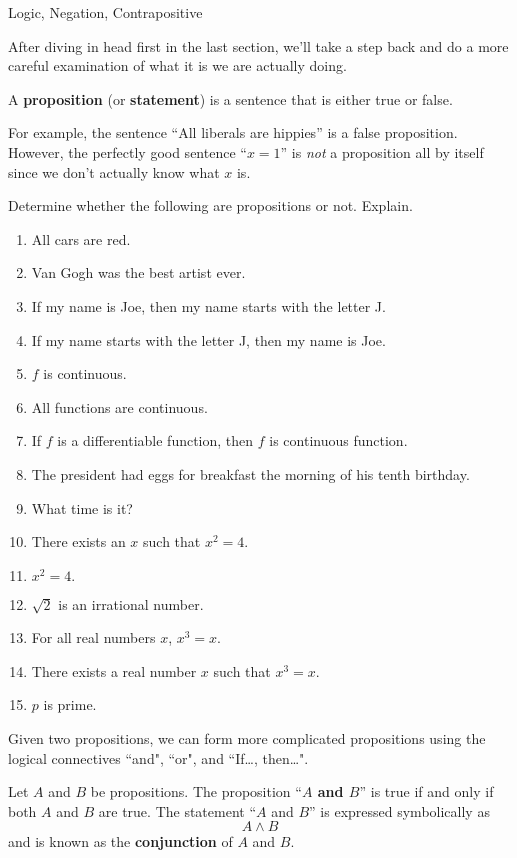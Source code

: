 \begin{section}{Logic, Negation, Contrapositive}

After diving in head first in the last section, we'll take a step back and do a more careful examination of what it is we are actually doing.

\begin{definition}
A \textbf{proposition} (or \textbf{statement}) is a sentence that is either true or false.
\end{definition}

For example, the sentence ``All liberals are hippies'' is a false proposition.  However, the perfectly good sentence ``$x=1$'' is \emph{not} a proposition all by itself since we don't actually know what $x$ is.

\begin{exercise} Determine whether the following are propositions or not. Explain.
\begin{enumerate}
\item All cars are red.
\item Van Gogh was the best artist ever. 
\item If my name is Joe, then my name starts with the letter J.
\item If my name starts with the letter J, then my name is Joe.
\item $f$ is continuous.
\item All functions are continuous.
\item If $f$ is a differentiable function, then $f$ is continuous function.
\item The president had eggs for breakfast the morning of his tenth birthday.
\item What time is it? 
\item There exists an $x$ such that $x^2=4$.
\item $x^2=4.$
\item $\sqrt{2}$ is an irrational number.
\item For all real numbers $x$, $x^3=x$.
\item There exists a real number $x$ such that $x^3=x$.
\item $p$ is prime.
\end{enumerate}
\end{exercise}

Given two propositions, we can form more complicated propositions using the logical connectives ``and", ``or", and ``If\ldots, then\ldots".

\begin{definition}
Let $A$ and $B$ be propositions.  The proposition ``\textbf{$A$ and $B$}'' is true if and only if both $A$ and $B$ are true.  The statement ``$A$ and $B$'' is expressed symbolically as 
\[
A \wedge B
\]
and is known as the \textbf{conjunction} of $A$ and $B$.
\end{definition}


\end{section}
